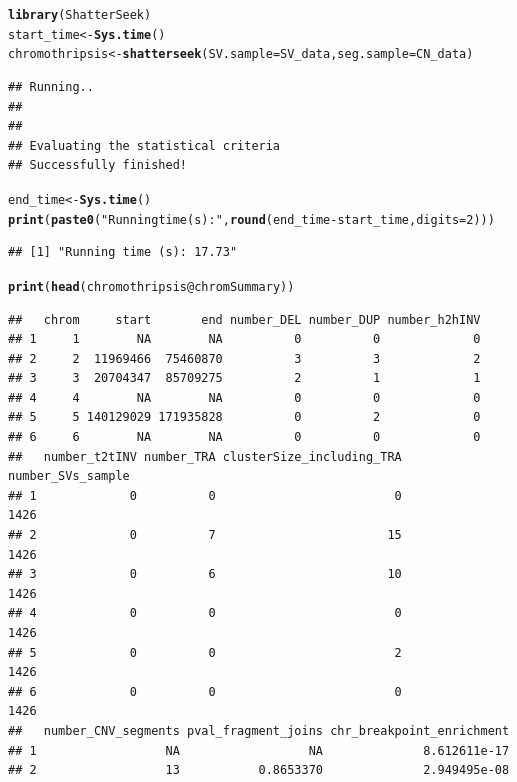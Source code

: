 \documentclass[twoside,a4wide,11pt]{article}\usepackage[]{graphicx}\usepackage[]{color}
\makeatletter
\newcommand{\hlnum}[1]{\textcolor[rgb]{0.686,0.059,0.569}{#1}}%
\newcommand{\hlstr}[1]{\textcolor[rgb]{0.192,0.494,0.8}{#1}}%
\newcommand{\hlopt}[1]{\textcolor[rgb]{0,0,0}{#1}}%
\newcommand{\hlstd}[1]{\textcolor[rgb]{0.345,0.345,0.345}{#1}}%
\newcommand{\hlkwb}[1]{\textcolor[rgb]{0.69,0.353,0.396}{#1}}%
\newcommand{\hlkwc}[1]{\textcolor[rgb]{0.333,0.667,0.333}{#1}}%
\newcommand{\hlkwd}[1]{\textcolor[rgb]{0.737,0.353,0.396}{\textbf{#1}}}%
\newenvironment{kframe}{%
 \def\at@end@of@kframe{}%
 \ifinner\ifhmode%
  \def\at@end@of@kframe{\end{minipage}}%
  \begin{minipage}{\columnwidth}%
 \fi\fi%
 \def\FrameCommand##1{\hskip\@totalleftmargin \hskip-\fboxsep
 \colorbox{shadecolor}{##1}\hskip-\fboxsep
     \hskip-\linewidth \hskip-\@totalleftmargin \hskip\columnwidth}%
 \MakeFramed {\advance\hsize-\width
   \@totalleftmargin\z@ \linewidth\hsize
   \@setminipage}}%
 {\par\unskip\endMakeFramed%
 \at@end@of@kframe}
\newenvironment{knitrout}{}{} %
\makeatother
\begin{document}
\begin{knitrout}
\color{fgcolor}\begin{kframe}
\begin{alltt}
\hlkwd{library}\hlstd{(ShatterSeek)}
\hlstd{start_time} \hlkwb{<-} \hlkwd{Sys.time}\hlstd{()}
\hlstd{chromothripsis} \hlkwb{<-} \hlkwd{shatterseek}\hlstd{(}\hlkwc{SV.sample}\hlstd{=SV_data,} \hlkwc{seg.sample}\hlstd{=CN_data)}
\end{alltt}
\begin{verbatim}
## Running..
## 
## 
## Evaluating the statistical criteria
## Successfully finished!
\end{verbatim}
\begin{alltt}
\hlstd{end_time} \hlkwb{<-} \hlkwd{Sys.time}\hlstd{()}
\hlkwd{print}\hlstd{(}\hlkwd{paste0}\hlstd{(}\hlstr{"Running time (s): "}\hlstd{,}\hlkwd{round}\hlstd{(end_time} \hlopt{-} \hlstd{start_time,}\hlkwc{digits}\hlstd{=}\hlnum{2}\hlstd{)))}
\end{alltt}
\begin{verbatim}
## [1] "Running time (s): 17.73"
\end{verbatim}
\begin{alltt}
\hlkwd{print}\hlstd{(}\hlkwd{head}\hlstd{(chromothripsis}\hlopt{@}\hlkwc{chromSummary}\hlstd{))}
\end{alltt}
\begin{verbatim}
##   chrom     start       end number_DEL number_DUP number_h2hINV
## 1     1        NA        NA          0          0             0
## 2     2  11969466  75460870          3          3             2
## 3     3  20704347  85709275          2          1             1
## 4     4        NA        NA          0          0             0
## 5     5 140129029 171935828          0          2             0
## 6     6        NA        NA          0          0             0
##   number_t2tINV number_TRA clusterSize_including_TRA number_SVs_sample
## 1             0          0                         0              1426
## 2             0          7                        15              1426
## 3             0          6                        10              1426
## 4             0          0                         0              1426
## 5             0          0                         2              1426
## 6             0          0                         0              1426
##   number_CNV_segments pval_fragment_joins chr_breakpoint_enrichment
## 1                  NA                  NA              8.612611e-17
## 2                  13           0.8653370              2.949495e-08

\end{verbatim}
\end{kframe}
\end{knitrout}
\end{document}
